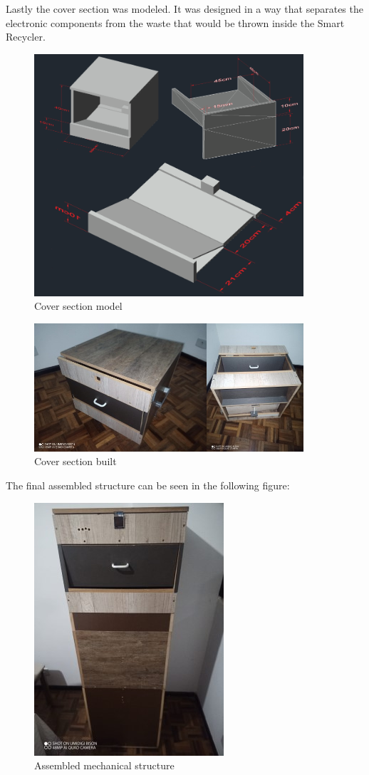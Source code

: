 \documentclass[a4paper,11pt]{article}
\begin{document}
Lastly the cover section was modeled. It was designed in a way that separates the electronic components from the waste that would be thrown inside the Smart Recycler.

\begin{figure}[H]
  \centering
  \includegraphics[width=10cm]{Figures/Cover Model.png}
  \caption{\small{Cover section model}}
  \label{fig:coverModel1}
\end{figure}

\begin{figure}[H]
  \centering
  \includegraphics[width=10cm]{Figures/Cover Built.png}
  \caption{\small{Cover section built}}
  \label{fig:coverModel2}
\end{figure}

The final assembled structure can be seen in the following figure:

\begin{figure}[H]
  \centering
  \includegraphics[scale=0.7]{Figures/Full Structure.jpg}
  \caption{\small{Assembled mechanical structure}}
  \label{fig:fullBody}
\end{figure}
\end{document}
